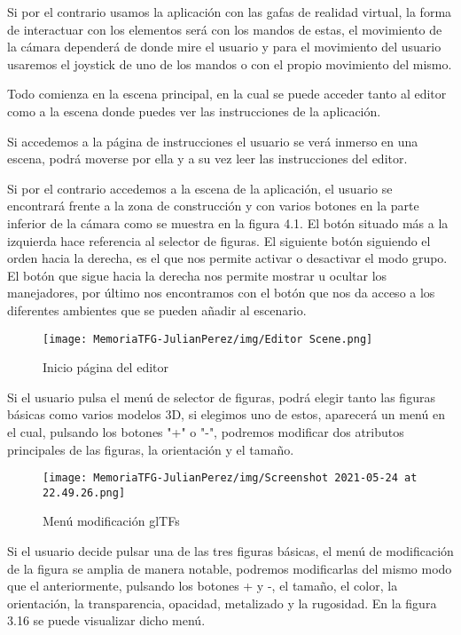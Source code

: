 \documentclass[a4paper, 12pt]{book}
\begin{document}
Si por el contrario usamos la aplicación con las gafas de realidad virtual, la forma de interactuar con los elementos será con los mandos de estas, el movimiento de la cámara dependerá de donde mire el usuario y  para el movimiento del usuario usaremos el joystick de uno de los mandos o con el propio movimiento del mismo.

Todo comienza en la escena principal, en la cual se puede acceder tanto al editor como a la escena donde puedes ver las instrucciones de la aplicación.

Si accedemos a la página de instrucciones el usuario se verá inmerso en una escena, podrá moverse por ella y a su vez leer las instrucciones del editor.

Si por el contrario accedemos a la escena de la aplicación, el usuario se encontrará frente a la zona de construcción y con varios botones en la parte inferior de la cámara como se muestra en la figura 4.1. El botón situado más a la izquierda hace referencia al selector de figuras. El siguiente botón siguiendo el orden hacia la derecha, es el que nos permite activar o desactivar el modo grupo. El botón que sigue hacia la derecha nos permite mostrar u ocultar los manejadores, por último nos encontramos con el botón que nos da acceso a los diferentes ambientes que se pueden añadir al escenario.

\begin{figure}[H]
  \centering
  \texttt{[image: MemoriaTFG-JulianPerez/img/Editor Scene.png]}
  \caption{Inicio página del editor}\label{home}
\end{figure}

Si el usuario pulsa el menú de selector de figuras, podrá elegir tanto las figuras básicas como varios modelos 3D, si elegimos uno de estos, aparecerá un menú en el cual, pulsando los botones "+" o "-", podremos modificar dos atributos principales de las figuras, la orientación y el tamaño.

\begin{figure}[H]
  \centering
  \texttt{[image: MemoriaTFG-JulianPerez/img/Screenshot 2021-05-24 at 22.49.26.png]}
  \caption{Menú modificación glTFs}\label{home}
\end{figure}

Si el usuario decide pulsar una de las tres figuras básicas, el menú de modificación de la figura se amplia de manera notable, podremos modificarlas del mismo modo que el anteriormente, pulsando los botones + y -, el tamaño, el color, la orientación, la transparencia, opacidad, metalizado y la rugosidad. En la figura 3.16 se puede visualizar dicho menú.
\end{document}

